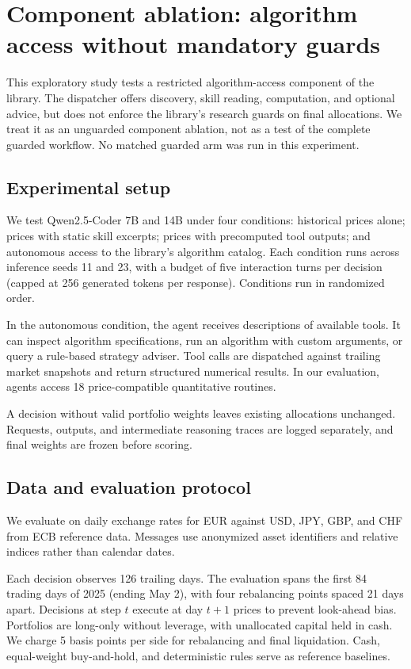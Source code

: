 \section{Component ablation: algorithm access without mandatory guards}
\label{sec:autonomous}
This exploratory study tests a restricted algorithm-access component of the library.
The dispatcher offers discovery, skill reading, computation, and optional advice, but
does not enforce the library's research guards on final allocations. We treat it as an
unguarded component ablation, not as a test of the complete guarded workflow. No matched
guarded arm was run in this experiment.

\subsection{Experimental setup}
We test Qwen2.5-Coder 7B and 14B under four conditions: historical prices alone; prices
with static skill excerpts; prices with precomputed tool outputs; and autonomous access
to the library's algorithm catalog. Each condition runs across inference seeds 11 and 23,
with a budget of five interaction turns per decision (capped at 256 generated tokens per
response). Conditions run in randomized order.

In the autonomous condition, the agent receives descriptions of available tools. It can
inspect algorithm specifications, run an algorithm with custom arguments, or query a
rule-based strategy adviser. Tool calls are dispatched against trailing market snapshots
and return structured numerical results. In our evaluation, agents access 18
price-compatible quantitative routines.

A decision without valid portfolio weights leaves existing allocations unchanged.
Requests, outputs, and intermediate reasoning traces are logged separately, and final
weights are frozen before scoring.

\subsection{Data and evaluation protocol}
We evaluate on daily exchange rates for EUR against USD, JPY, GBP, and CHF from ECB
reference data. Messages use anonymized asset identifiers and relative indices rather
than calendar dates.

Each decision observes 126 trailing days. The evaluation spans the first 84 trading days
of 2025 (ending May 2), with four rebalancing points spaced 21 days apart. Decisions at
step $t$ execute at day $t+1$ prices to prevent look-ahead bias. Portfolios are long-only
without leverage, with unallocated capital held in cash. We charge 5 basis points per
side for rebalancing and final liquidation. Cash, equal-weight buy-and-hold, and
deterministic rules serve as reference baselines.

